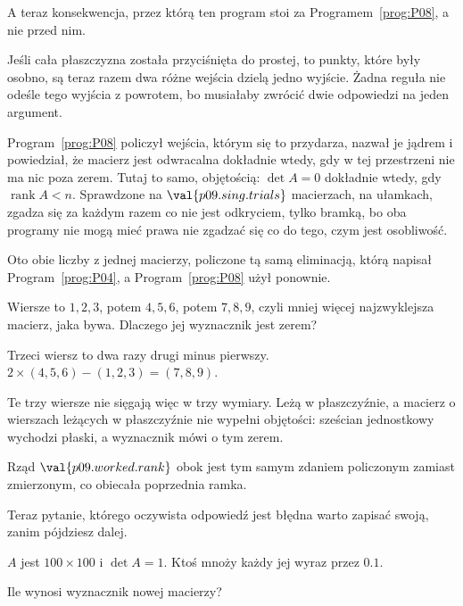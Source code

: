\begin{fr}
A teraz konsekwencja, przez którą ten program stoi za
Programem~\ref{prog:P08}, a nie przed nim.

Jeśli cała płaszczyzna została przyciśnięta do prostej, to punkty, które były
osobno, są teraz razem \dash{} dwa różne wejścia dzielą jedno wyjście. Żadna
reguła nie odeśle tego wyjścia z powrotem, bo musiałaby zwrócić dwie odpowiedzi
na jeden argument.

Program~\ref{prog:P08} policzył wejścia, którym się to przydarza, nazwał je
jądrem i powiedział, że macierz jest odwracalna dokładnie wtedy, gdy w tej
przestrzeni nie ma nic poza zerem. Tutaj to samo, objętością:
$\det A = 0$ dokładnie wtedy, gdy $\operatorname{rank} A < n$. Sprawdzone na
$\val{p09.sing.trials}$ macierzach, na ułamkach, zgadza się za każdym razem
\dash{} co nie jest odkryciem, tylko bramką, bo oba programy nie mogą mieć
prawa nie zgadzać się co do tego, czym jest osobliwość.
\end{fr}

\begin{fr}
Oto obie liczby z jednej macierzy, policzone tą samą eliminacją, którą napisał
Program~\ref{prog:P04}, a Program~\ref{prog:P08} użył ponownie.


Wiersze to $1, 2, 3$, potem $4, 5, 6$, potem $7, 8, 9$, czyli mniej więcej
najzwyklejsza macierz, jaka bywa. Dlaczego jej wyznacznik jest zerem?
\dotline
\nextframe
\end{fr}

\begin{fr}
\begin{ansblock}
Trzeci wiersz to dwa razy drugi minus pierwszy. $2 \times (4,5,6) - (1,2,3)
= (7,8,9)$.
\end{ansblock}

Te trzy wiersze nie sięgają więc w trzy wymiary. Leżą w płaszczyźnie, a macierz
o wierszach leżących w płaszczyźnie nie wypełni objętości: sześcian jednostkowy
wychodzi płaski, a wyznacznik mówi o tym zerem.

Rząd $\val{p09.worked.rank}$ obok jest tym samym zdaniem policzonym zamiast
zmierzonym, co obiecała poprzednia ramka.
\end{fr}


\begin{fr}
Teraz pytanie, którego oczywista odpowiedź jest błędna \dash{} warto zapisać
swoją, zanim pójdziesz dalej.

$A$ jest $100 \times 100$ i $\det A = 1$. Ktoś mnoży każdy jej wyraz przez
$\num{0.1}$.

Ile wynosi wyznacznik nowej macierzy?
\dotline
\nextframe
\end{fr}


